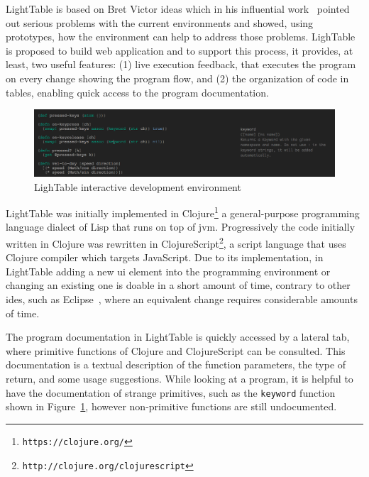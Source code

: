 LightTable is based on Bret Victor ideas which in his influential work~\citep{inventingPrin,learnableProg} pointed out serious problems with the current environments and showed, using prototypes, how the environment can help to address those problems. LighTable is proposed to build web application and to support this process, it provides, at least, two useful features: (1) live execution feedback, that executes the program on every change showing the program flow, and (2) the organization of code in tables, enabling quick access to the program documentation.

\begin{figure}[!htbp]
  \centering
  \includegraphics[width=1.0\textwidth]{images/lt2}
    \caption{LighTable interactive development environment}
  \label{fig:lt}
\end{figure} 

LightTable was initially implemented in Clojure\footnote{\texttt{https://clojure.org/}} a general-purpose programming language dialect of Lisp that runs on top of \gls{jvm}. Progressively the code initially written in Clojure was rewritten in ClojureScript\footnote{\texttt{http://clojure.org/clojurescript}}, a script language that uses Clojure compiler which targets JavaScript. Due to its implementation, in LightTable adding a new \gls{ui} element into the programming environment or changing an existing one is doable in a short amount of time, contrary to other \glspl{ide}, such as Eclipse~\citep{carlson2005eclipse}, where an equivalent change requires considerable amounts of time. 

The program documentation in LightTable is quickly accessed by a lateral tab, where primitive functions of Clojure and ClojureScript can be consulted. This documentation is a textual description of the function parameters, the type of return, and some usage suggestions. While looking at a program, it is helpful to have the documentation of strange primitives, such as the \texttt{keyword} function shown in Figure~\ref{fig:lt}, however non-primitive functions are still undocumented. 

